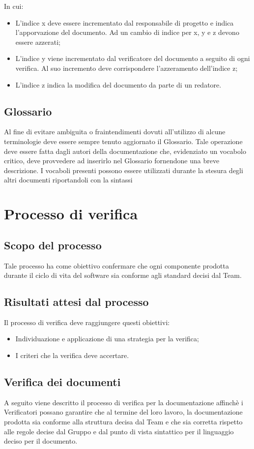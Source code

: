 In cui:
\begin{itemize}
\item L'indice x deve essere incrementato dal responsabile di progetto e indica l'apporvazione del documento. Ad un cambio di indice per x, y e z devono essere azzerati;
\item L'indice y viene incrementato dal verificatore del documento a seguito di ogni verifica. Al suo incremento deve corrispondere l'azzeramento dell'indice z;
\item L'indice z indica la modifica del documento da parte di un redatore.
\end{itemize}

\subsection{Glossario}
Al fine di evitare ambiguita o fraintendimenti dovuti all'utilizzo di alcune terminologie deve essere sempre tenuto aggiornato il Glossario. Tale operazione deve essere fatta dagli autori della documentazione che, evidenziato un vocabolo critico, deve provvedere ad inserirlo nel Glossario fornendone una breve descrizione. I vocaboli presenti possono essere utilizzati durante la stesura degli altri documenti riportandoli con la sintassi 

\section{Processo di verifica}
\subsection{Scopo del processo}
Tale processo ha come obiettivo confermare che ogni componente prodotta durante il ciclo di vita del software sia conforme agli standard decisi dal Team.
\subsection{Risultati attesi dal processo}
Il processo di verifica deve raggiungere questi obiettivi:
\begin{itemize}
\item Individuazione e applicazione di una strategia per la verifica;
\item I criteri che la verifica deve accertare.
\end{itemize}

\subsection{Verifica dei documenti}
A seguito viene descritto il processo di verifica per la documentazione affinchè i Verificatori possano garantire che al termine del loro lavoro, la documentazione prodotta sia conforme alla struttura decisa dal Team e che sia corretta rispetto alle regole decise dal Gruppo e dal punto di vista sintattico per il linguaggio deciso per il documento.

